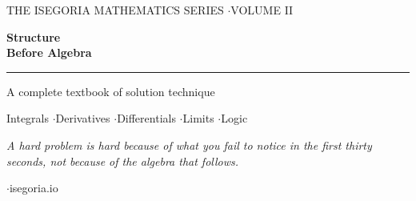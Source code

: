 \begin{titlepage}
\thispagestyle{empty}
\centering
\vspace*{1.05in}

{\sffamily\fontsize{8.5}{10}\selectfont\color{emerald}\MakeUppercase{The Isegoria Mathematics Series \quad$\cdot$\quad Volume II}}

\vspace{0.42in}

{\sffamily\bfseries\fontsize{40}{44}\selectfont\color{navy} Structure\\[2pt] Before Algebra}

\vspace{0.26in}

{\color{emerald}\rule{2.7in}{0.9pt}}

\vspace{0.26in}

{\fontsize{13.5}{17}\selectfont\color{ink!85}
A complete textbook of solution technique}

\vspace{0.14in}

{\sffamily\fontsize{10}{14}\selectfont\color{ink!62}
Integrals \quad$\cdot$\quad Derivatives \quad$\cdot$\quad Differentials \quad$\cdot$\quad Limits \quad$\cdot$\quad Logic}

\vfill

\begin{minipage}{4.35in}
\centering\itshape\fontsize{10.2}{14}\selectfont\color{ink!78}
A hard problem is hard because of what you fail to notice in the first thirty
seconds, not because of the algebra that follows.
\end{minipage}

\vfill

{\sffamily\fontsize{9}{12}\selectfont\color{ink!58}
\the\year \quad$\cdot$\quad isegoria.io}

\vspace{0.5in}
\end{titlepage}

